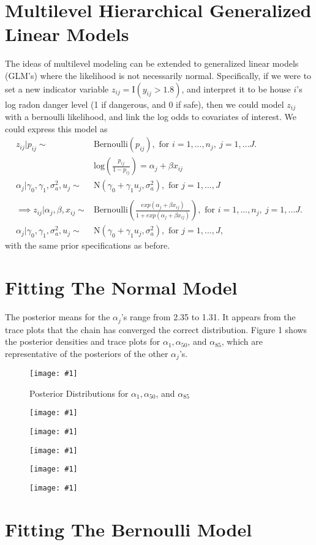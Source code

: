 \documentclass{article}
\def\beginmyfig{\begin{figure}[htbp]\begin{center}}
\def\endmyfig{\end{center}\end{figure}}
\def\myfig#1#2{\beginmyfig\texttt{[image: \#1]}\caption{#2}\endmyfig}
\begin{document}
\section{Multilevel Hierarchical Generalized Linear Models}
The ideas of multilevel modeling can be extended to generalized linear models
(GLM's) where the likelihood is not necessarily normal. Specifically, if we
were to set a new indicator variable $z_{ij} = \text{I}(y_{ij}>1.8)$, and interpret
it to be house $i$'s log radon danger level (1 if dangerous, and 0 if safe), then
we could model $z_{ij}$ with a bernoulli likelihood, and link the log odds
to covariates of interest. We could express this model as
\begin{align*}
  z_{ij}|p_{ij} \sim & \text{Bernoulli}(p_{ij}),\text{ for }i=1,...,n_j,~j=1,...J.\\
  &\text{log}\left(\frac{p_{ij}}{1-p_{ij}}\right) = \alpha_j+\beta x_{ij}\\
  \alpha_{j}|\gamma_0,\gamma_1,\sigma_a^2,u_j \sim & \text{N}(\gamma_0 +
      \gamma_1 u_j,\sigma_a^2),\text{ for }j=1,...,J\\
  \\
  \implies
  z_{ij}|\alpha_j,\beta,x_{ij} \sim &
      \text{Bernoulli}\left(\frac{exp(\alpha_j+\beta x_{ij})}{1+exp(\alpha_j+\beta
      x_{ij})}\right),\text{ for }i=1,...,n_j,~j=1,...J.\\
  \alpha_{j}|\gamma_0,\gamma_1,\sigma_a^2,u_j \sim & \text{N}(\gamma_0 +
      \gamma_1 u_j,\sigma_a^2),\text{ for }j=1,...,J,
\end{align*}
with the same prior specifications as before.

\section{Fitting The Normal Model}
The posterior means for the $\alpha_j$'s range from 2.35 to 1.31. It appears from the trace
plots that the chain has converged the correct distribution. Figure 1 shows the posterior
densities and trace plots for $\alpha_1,\alpha_{50}$, and $\alpha_{85}$, which are representative
of the posteriors of the other $\alpha_j$'s.
\myfig{images/apost.pdf}{Posterior Distributions for $\alpha_1,\alpha_{50}$, and $\alpha_{85}$}

\myfig{images/bpost.pdf}{}
\myfig{images/gpost.pdf}{}
\myfig{images/sy2post.pdf}{}
\myfig{images/sa2post.pdf}{}
\myfig{images/au.pdf}{}

\section{Fitting The Bernoulli Model}
\end{document}

